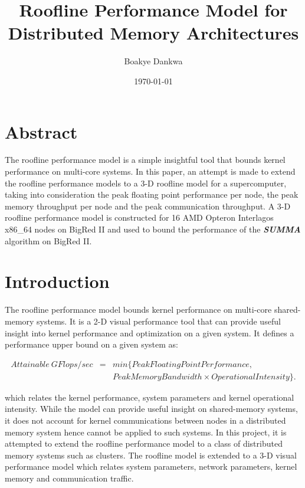 \documentclass[dvips,12pt]{article}
\begin{document}

\title{Roofline Performance Model for Distributed Memory Architectures}
\author{Boakye Dankwa}
\date{\today}



\maketitle


\section{Abstract}
The roofline performance model\cite{rfline09} is a simple insightful tool that bounds kernel performance on multi-core systems. In this paper, an attempt is made to extend the roofline performance models to a 3-D  roofline model for a supercomputer, taking into consideration the peak floating point performance per node, the peak memory throughput per node and the peak communication throughput. A 3-D roofline performance model is constructed for 16 AMD Opteron Interlagos x86\_64 nodes on BigRed II and used to bound the performance of the \textit{\textbf{SUMMA}} algorithm \cite{summa96} on BigRed II.

\section{Introduction}
The roofline performance model bounds kernel performance on multi-core shared-memory systems. It is a 2-D visual performance tool that can provide useful insight into kernel performance and optimization on a given system. It defines a performance upper bound on a given system as:

\begin{eqnarray}
Attainable \: GFlops/sec &=& min \{Peak Floating Point Performance, \nonumber \\
& & Peak Memory Bandwidth \times Operational Intensity \}.
\label{attainable}
\end{eqnarray}

which relates the kernel performance, system parameters and kernel operational intensity. While the model can provide useful insight on shared-memory systems, it does not account for kernel communications between nodes in a distributed memory system hence cannot be applied to such systems. In this project, it is attempted to extend the roofline performance model to a class of distributed memory systems such as clusters. The roofline model is extended to a 3-D visual performance model which relates system parameters, network parameters, kernel memory and communication traffic.
\end{document}
